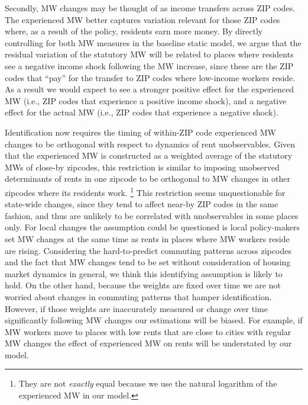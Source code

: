 Secondly, MW changes may be thought of as income transfers across ZIP codes. The experienced MW 
better captures variation relevant for those ZIP codes where, as a result of the policy, residents 
earn more money. By directly controlling for both MW measures in the baseline static model, we argue 
that the residual variation of the statutory MW will be related to places where residents see a 
negative income shock following the MW increase, since these are the ZIP codes that ``pay'' for the 
transfer to ZIP codes where low-income workers reside. As a result we would expect to see a stronger 
positive effect for the experienced MW (i.e., ZIP codes that experience a positive income shock), 
and a negative effect for the actual MW (i.e., ZIP codes that experience a negative shock).

Identification now requires the timing of within-ZIP code experienced MW changes to be orthogonal 
with respect to dynamics of rent unobservables. Given that the experienced MW is constructed as a 
weighted average of the statutory MWs of close-by zipcodes, this restriction is similar to imposing 
unobserved determinants of rents in one zipcode to be orthogonal to MW changes in other zipcodes 
where its residents work. \footnote{They are not \textit{exactly} equal because we use the natural 
	logarithm of the experienced MW in our model.}
This restriction seems unquestionable for state-wide changes, since they tend to affect near-by ZIP 
codes in the same fashion, and thus are unlikely to be correlated with unobservables in some places 
only. For local changes the assumption could be questioned is local policy-makers set MW changes at 
the same time as rents in places where MW workers reside are rising. Considering the hard-to-predict 
commuting patterns across zipcodes and the fact that MW changes tend to be set without consideration 
of housing market dynamics in general, we think this identifying assumption is likely to hold. On the 
other hand, because the weights are fixed over time we are not worried about changes in commuting 
patterns that hamper identification. However, if those weights are inaccurately measured or change 
over time significantly following MW changes our estimations will be biased. For example, if MW workers 
move to places with low rents that are close to cities with regular MW changes the effect of 
experienced MW on rents will be understated by our model.

